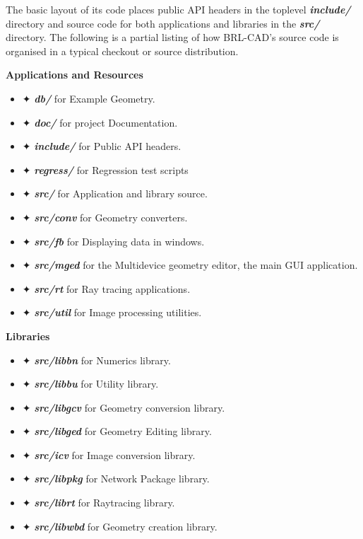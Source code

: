 \hspace{30} The   basic   layout   of   its   code   places   public   API   headers   in   the   top­level  
\textit{\textbf{include/}}   directory   and   source   code   for   both   applications   and   libraries   in   the  
\textit{\textbf{src/}}   directory.   The   following   is   a   partial   listing   of   how   BRL-­CAD's   source   code  
is organised in a typical checkout or source distribution. 

\textbf{Applications and Resources}  

\begin{itemize} 
\item✦ \textit{\textbf{db/}} for Example Geometry.  
\item✦ \textit{\textbf{doc/}} for project Documentation.  
\item✦ \textit{\textbf{include/}} for Public API headers.  
\item✦ \textit{\textbf{regress/}} for Regression test scripts  
\item✦ \textit{\textbf{src/}} for Application and library source.  
\item✦ \textit{\textbf{src/conv}} for Geometry converters.  
\item✦ \textit{\textbf{src/fb}} for Displaying data in windows.  
\item✦ \textit{\textbf{src/mged}} for the Multi­device geometry editor, the main GUI application.   
\item✦ \textit{\textbf{src/rt}} for Ray tracing applications.  
\item✦ \textit{\textbf{src/util}} for Image processing utilities.
\end{itemize}  

\textbf{Libraries}
  
\begin{itemize} 
\item✦ \textit{\textbf{src/libbn}} for Numerics library.  
\item✦ \textit{\textbf{src/libbu}} for Utility library.  
\item✦ \textit{\textbf{src/libgcv}} for Geometry conversion library.  
\item✦ \textit{\textbf{src/libged}} for Geometry Editing library.  
\item✦ \textit{\textbf{src/icv}} for Image conversion library.  
\item✦ \textit{\textbf{src/libpkg}} for Network Package library.  
\item✦ \textit{\textbf{src/librt}} for Ray­tracing library.  
\item✦ \textit{\textbf{src/libwbd}} for Geometry creation library.
\end{itemize}

